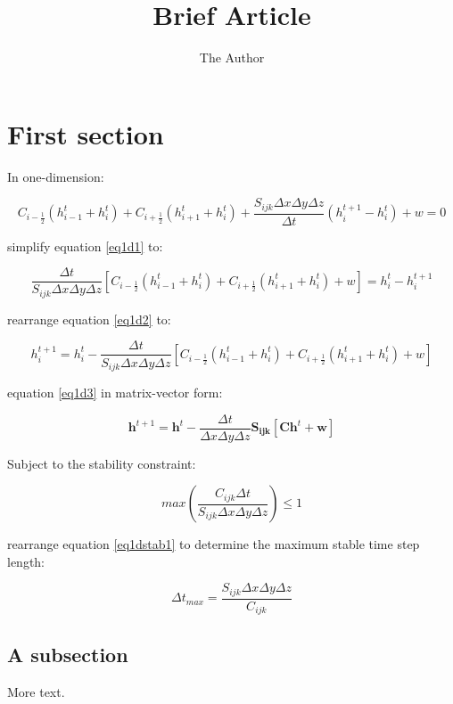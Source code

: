 \documentclass[11pt]{article} %
\title{Brief Article}
\author{The Author}
\begin{document}
\maketitle

\section{First section}

In one-dimension:

\begin{equation} \label{eq1d1}
C_{i-\frac{1}{2}} \left( h^t_{i-1} + h^t_i \right) + C_{i+\frac{1}{2}} \left( h^t_{i+1} + h^t_i \right) + \frac{S_{ijk} \Delta x \Delta y \Delta z}{\Delta t} \left( h^{t+1}_{i} - h^t_i \right) + w = 0
\end{equation}

\noindent simplify equation \ref{eq1d1} to:

\begin{equation} \label{eq1d2}
\frac{\Delta t}{S_{ijk} \Delta x \Delta y \Delta z} \left[ C_{i-\frac{1}{2}} \left( h^t_{i-1} + h^t_i \right) + C_{i+\frac{1}{2}} \left( h^t_{i+1} + h^t_i \right) + w \right] = h^t_{i} - h^{t+1}_i
\end{equation}

\noindent rearrange equation \ref{eq1d2} to:

\begin{equation} \label{eq1d3}
h^{t+1}_i = h^t_{i} - \frac{\Delta t}{S_{ijk} \Delta x \Delta y \Delta z} \left[ C_{i-\frac{1}{2}} \left( h^t_{i-1} + h^t_i \right) + C_{i+\frac{1}{2}} \left( h^t_{i+1} + h^t_i \right) + w \right] 
\end{equation}

\noindent equation \ref{eq1d3} in matrix-vector form:

\begin{equation} \label{eq1dvec}
\mathbf{h}^{t+1} = \mathbf{h}^t - \frac{\Delta t}{\Delta x \Delta y \Delta z} \mathbf{S_{ijk} } \left[ \mathbf{C} \mathbf{h}^{t} + \mathbf{w} \right] 
\end{equation}

\noindent Subject to the stability constraint:

\begin{equation} \label{eq1dstab1}
max \left( \frac{C_{ijk} \Delta t}{S_{ijk} \Delta x \Delta y \Delta z} \right) \le 1 
\end{equation}

\noindent rearrange equation \ref{eq1dstab1} to determine the maximum stable time step length:

\begin{equation} \label{eq1dstab2}
\Delta t_{max} = \frac{S_{ijk} \Delta x \Delta y \Delta z}{C_{ijk} } 
\end{equation}

\subsection{A subsection}

More text.
\end{document}
